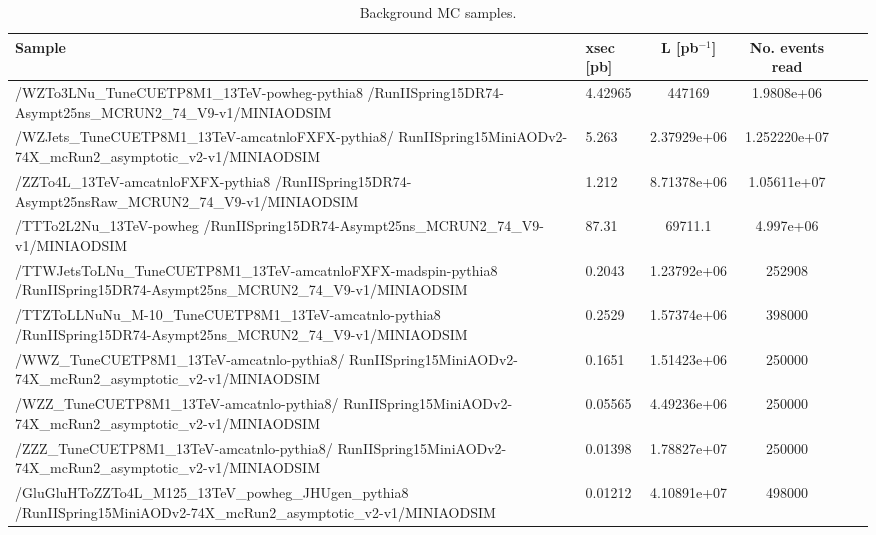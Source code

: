 \begin{table}
\centering
\caption{Background MC samples.} \label{tab:MCSamples}
\begin{tabular}{p{14cm} l c c c l}
\hline\hline
Sample & xsec [pb] & L [pb$^{-1}$] & No. events read\\
\hline
/WZTo3LNu\_TuneCUETP8M1\_13TeV-powheg-pythia8 \newline /RunIISpring15DR74-Asympt25ns\_MCRUN2\_74\_V9-v1/MINIAODSIM	& 4.42965	& 447169	& 1.9808e+06\\
\hline
/WZJets\_TuneCUETP8M1\_13TeV-amcatnloFXFX-pythia8/ \newline RunIISpring15MiniAODv2-74X\_mcRun2\_asymptotic\_v2-v1/MINIAODSIM	& 5.263	& 2.37929e+06	& 1.252220e+07\\
\hline
/ZZTo4L\_13TeV-amcatnloFXFX-pythia8 \newline /RunIISpring15DR74-Asympt25nsRaw\_MCRUN2\_74\_V9-v1/MINIAODSIM	& 1.212	& 8.71378e+06	& 1.05611e+07\\
\hline
/TTTo2L2Nu\_13TeV-powheg \newline /RunIISpring15DR74-Asympt25ns\_MCRUN2\_74\_V9-v1/MINIAODSIM	& 87.31	& 69711.1	& 4.997e+06\\ 
\hline
/TTWJetsToLNu\_TuneCUETP8M1\_13TeV-amcatnloFXFX-madspin-pythia8 \newline /RunIISpring15DR74-Asympt25ns\_MCRUN2\_74\_V9-v1/MINIAODSIM	& 0.2043	& 1.23792e+06	& 252908\\
\hline
/TTZToLLNuNu\_M-10\_TuneCUETP8M1\_13TeV-amcatnlo-pythia8 \newline /RunIISpring15DR74-Asympt25ns\_MCRUN2\_74\_V9-v1/MINIAODSIM	& 0.2529	& 1.57374e+06	& 398000\\
\hline
/WWZ\_TuneCUETP8M1\_13TeV-amcatnlo-pythia8/ \newline RunIISpring15MiniAODv2-74X\_mcRun2\_asymptotic\_v2-v1/MINIAODSIM	& 0.1651	& 1.51423e+06	& 250000\\
\hline
/WZZ\_TuneCUETP8M1\_13TeV-amcatnlo-pythia8/ \newline RunIISpring15MiniAODv2-74X\_mcRun2\_asymptotic\_v2-v1/MINIAODSIM	& 0.05565	& 4.49236e+06	& 250000\\
\hline
/ZZZ\_TuneCUETP8M1\_13TeV-amcatnlo-pythia8/ \newline RunIISpring15MiniAODv2-74X\_mcRun2\_asymptotic\_v2-v1/MINIAODSIM	& 0.01398	& 1.78827e+07	& 250000\\
\hline
/GluGluHToZZTo4L\_M125\_13TeV\_powheg\_JHUgen\_pythia8 \newline /RunIISpring15MiniAODv2-74X\_mcRun2\_asymptotic\_v2-v1/MINIAODSIM	& 0.01212	& 4.10891e+07	& 498000\\

\end{tabular}
\end{table}
